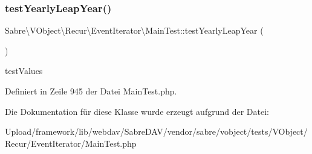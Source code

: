 \subsubsection{\texorpdfstring{test\+Yearly\+Leap\+Year()}{testYearlyLeapYear()}}
{\footnotesize\ttfamily Sabre\textbackslash{}\+V\+Object\textbackslash{}\+Recur\textbackslash{}\+Event\+Iterator\textbackslash{}\+Main\+Test\+::test\+Yearly\+Leap\+Year (\begin{DoxyParamCaption}{ }\end{DoxyParamCaption})}

test\+Values 

Definiert in Zeile 945 der Datei Main\+Test.\+php.



Die Dokumentation für diese Klasse wurde erzeugt aufgrund der Datei\+:\begin{DoxyCompactItemize}
\item 
Upload/framework/lib/webdav/\+Sabre\+D\+A\+V/vendor/sabre/vobject/tests/\+V\+Object/\+Recur/\+Event\+Iterator/Main\+Test.\+php\end{DoxyCompactItemize}
